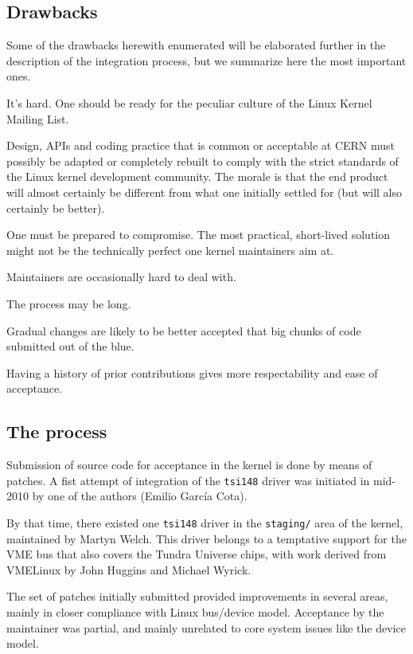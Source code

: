 \documentclass{JAC2003}
\begin{document}
\subsection{Drawbacks}

Some of the drawbacks herewith enumerated will be elaborated further in
the description of the integration process, but we summarize here the
most important ones.

\begin{Itemize}
\item It's hard. One should be ready for the peculiar culture of the
    Linux Kernel Mailing List.
\item Design, APIs and coding practice that is common or acceptable at
    CERN must possibly be adapted or completely rebuilt to comply with the
    strict standards of the Linux kernel development community. The morale
    is that the end product will almost certainly be different from what one
    initially settled for (but will also certainly be better).
\item One must be prepared to compromise. The most practical,
    short-lived solution might not be the technically perfect one kernel
    maintainers aim at.
\item Maintainers are occasionally hard to deal with.
\item The process may be long.
\item Gradual changes are likely to be better accepted that big chunks
    of code submitted out of the blue.  
\item Having a history of prior contributions gives more respectability
    and ease of acceptance.
\end{Itemize}

\subsection{The process}

Submission of source code for acceptance in the kernel is done by means
of patches. A fist attempt of integration of the \verb|tsi148| driver
was initiated in mid-2010 by one of the authors (Emilio Garc\'ia
Cota). 

By that time, there existed one \verb|tsi148| driver in the
\texttt{staging/} area of the kernel, maintained by Martyn Welch. This
driver belongs to a temptative support for the VME bus that also covers
the Tundra Universe chips, with work derived from VMELinux by John
Huggins and Michael Wyrick.

The set of patches initially submitted provided improvements in several
areas, mainly in closer compliance with Linux bus/device model.
Acceptance by the maintainer was partial, and mainly unrelated to core
system issues like the device model.
\end{document}
